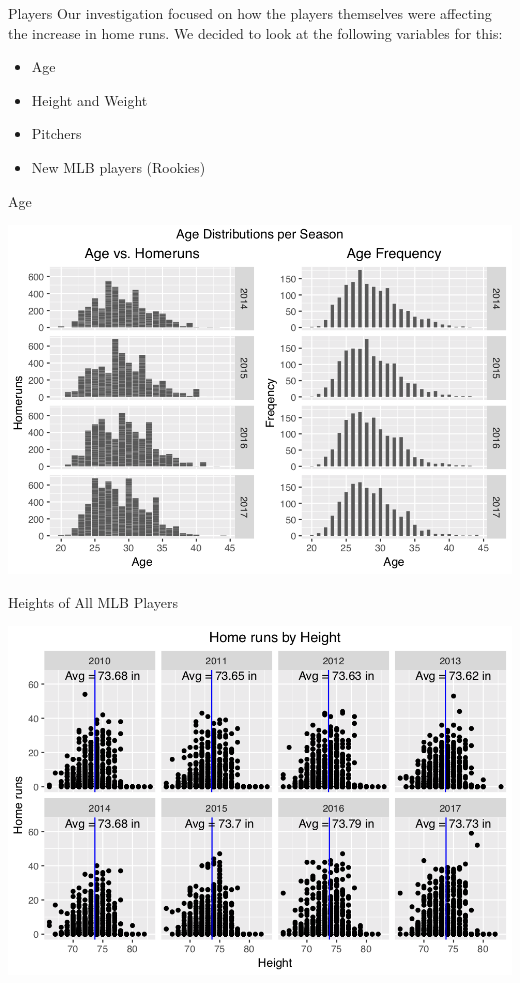 \documentclass[14pt]{bredelebeamer}
\begin{document}
\begin{frame}
\begin{block}{\large Players}
{ \large Our investigation focused on how the players themselves were affecting the increase in home runs. We decided to look at the following variables for this:\\}
	\begin{itemize}
    	\item \large Age
        \item \large Height and Weight
        \item \large Pitchers
        \item \large New MLB players (Rookies)
    \end{itemize}
\end{block}
\end{frame}


\begin{frame}{Age}
	\begin{center}
    	\includegraphics[scale = 0.6]{Graphs/homerun_ages.png}
    \end{center}
\end{frame}


\begin{frame}{Heights of All MLB Players}
	\begin{center}
    	\includegraphics[scale = 0.6]{Graphs/wh_with_pitchers.png}
    \end{center}
\end{frame}
\end{document}
